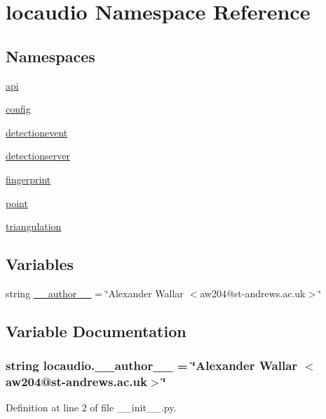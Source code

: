 \hypertarget{namespacelocaudio}{\section{locaudio Namespace Reference}
\label{namespacelocaudio}
}
\subsection*{Namespaces}
\begin{DoxyCompactItemize}
\item 
\hyperlink{namespacelocaudio_1_1api}{api}
\item 
\hyperlink{namespacelocaudio_1_1config}{config}
\item 
\hyperlink{namespacelocaudio_1_1detectionevent}{detectionevent}
\item 
\hyperlink{namespacelocaudio_1_1detectionserver}{detectionserver}
\item 
\hyperlink{namespacelocaudio_1_1fingerprint}{fingerprint}
\item 
\hyperlink{namespacelocaudio_1_1point}{point}
\item 
\hyperlink{namespacelocaudio_1_1triangulation}{triangulation}
\end{DoxyCompactItemize}
\subsection*{Variables}
\begin{DoxyCompactItemize}
\item 
string \hyperlink{namespacelocaudio_a08bd2e574ba3b2af29ee1231a056dcc5}{\-\_\-\-\_\-author\-\_\-\-\_\-} = \char`\"{}Alexander Wallar $<$aw204@st-\/andrews.\-ac.\-uk$>$\char`\"{}
\end{DoxyCompactItemize}


\subsection{Variable Documentation}
\hypertarget{namespacelocaudio_a08bd2e574ba3b2af29ee1231a056dcc5}{
\subsubsection[{\-\_\-\-\_\-author\-\_\-\-\_\-}]{\setlength{\rightskip}{0pt plus 5cm}string locaudio.\-\_\-\-\_\-author\-\_\-\-\_\- = \char`\"{}Alexander Wallar $<$aw204@st-\/andrews.\-ac.\-uk$>$\char`\"{}}}\label{namespacelocaudio_a08bd2e574ba3b2af29ee1231a056dcc5}


Definition at line 2 of file \-\_\-\-\_\-init\-\_\-\-\_\-.\-py.

